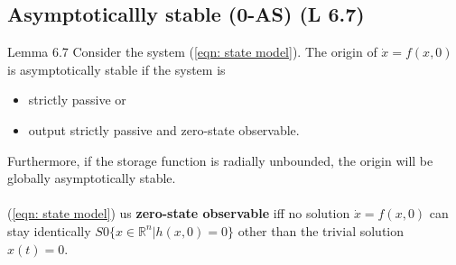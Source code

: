 \documentclass{article}
\begin{document}
\subsection{Asymptoticallly stable (0-AS) (L 6.7)}
Lemma 6.7 Consider the system (\ref{eqn: state model}). The origin of $\dot{x}=f(x, 0)$ is asymptotically stable if the system is
\begin{itemize}
	\item strictly passive or
	\item output strictly passive and zero-state observable.
\end{itemize}
Furthermore, if the storage function is radially unbounded, the origin will be globally asymptotically stable.
\\\\
(\ref{eqn: state model}) us \textbf{zero-state observable} iff no solution $\dot{x}=f(x,0)$ can stay identically $S 0 \{x \in \mathbb{R}^{n} | h(x,0) = 0\}$ other than the trivial solution $x(t) = 0$.
\end{document}

